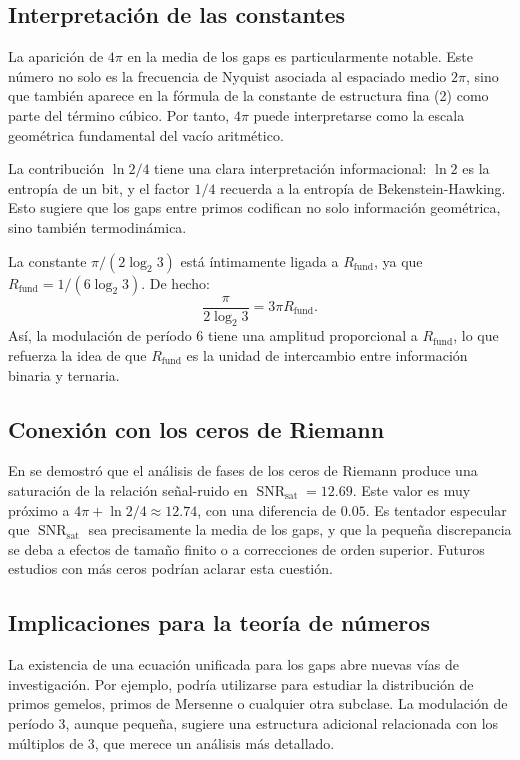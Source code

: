 \documentclass[12pt,a4paper]{article}
\theoremstyle{plain}
\theoremstyle{definition}
\theoremstyle{remark}
\newcommand{\SNR}{\operatorname{SNR}}
\newcommand{\Rfund}{R_{\text{fund}}}
\newcommand{\SNRsat}{\SNR_{\text{sat}}}
\begin{document}
\subsection{Interpretación de las constantes}

La aparición de $4\pi$ en la media de los gaps es particularmente notable. Este número no solo es la frecuencia de Nyquist asociada al espaciado medio $2\pi$, sino que también aparece en la fórmula de la constante de estructura fina (2) como parte del término cúbico. Por tanto, $4\pi$ puede interpretarse como la escala geométrica fundamental del vacío aritmético.

La contribución $\ln 2/4$ tiene una clara interpretación informacional: $\ln 2$ es la entropía de un bit, y el factor $1/4$ recuerda a la entropía de Bekenstein-Hawking. Esto sugiere que los gaps entre primos codifican no solo información geométrica, sino también termodinámica.

La constante $\pi/(2\log_2 3)$ está íntimamente ligada a $\Rfund$, ya que $\Rfund = 1/(6\log_2 3)$. De hecho:
\begin{equation}
\frac{\pi}{2\log_2 3} = 3\pi \Rfund.
\end{equation}
Así, la modulación de período 6 tiene una amplitud proporcional a $\Rfund$, lo que refuerza la idea de que $\Rfund$ es la unidad de intercambio entre información binaria y ternaria.

\subsection{Conexión con los ceros de Riemann}

En \cite{PeinadorSpectrum} se demostró que el análisis de fases de los ceros de Riemann produce una saturación de la relación señal-ruido en $\SNRsat = 12.69$. Este valor es muy próximo a $4\pi + \ln 2/4 \approx 12.74$, con una diferencia de $0.05$. Es tentador especular que $\SNRsat$ sea precisamente la media de los gaps, y que la pequeña discrepancia se deba a efectos de tamaño finito o a correcciones de orden superior. Futuros estudios con más ceros podrían aclarar esta cuestión.

\subsection{Implicaciones para la teoría de números}

La existencia de una ecuación unificada para los gaps abre nuevas vías de investigación. Por ejemplo, podría utilizarse para estudiar la distribución de primos gemelos, primos de Mersenne o cualquier otra subclase. La modulación de período 3, aunque pequeña, sugiere una estructura adicional relacionada con los múltiplos de 3, que merece un análisis más detallado.
\end{document}

